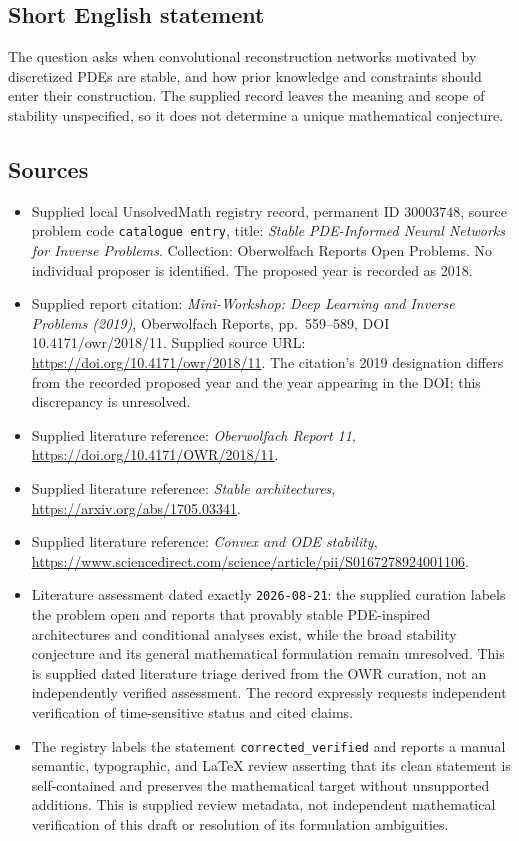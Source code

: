 \documentclass[11pt]{article}
\begin{document}
\subsection{Short English statement}
The question asks when convolutional reconstruction networks motivated by discretized PDEs are stable, and how prior knowledge and constraints should enter their construction. The supplied record leaves the meaning and scope of stability unspecified, so it does not determine a unique mathematical conjecture.
\subsection{Sources}
\begin{itemize}
\item Supplied local UnsolvedMath registry record, permanent ID \(30003748\), source problem code \texttt{catalogue entry}, title: \emph{Stable PDE-Informed Neural Networks for Inverse Problems}. Collection: Oberwolfach Reports Open Problems. No individual proposer is identified. The proposed year is recorded as 2018.
\item Supplied report citation: \emph{Mini-Workshop: Deep Learning and Inverse Problems (2019)}, Oberwolfach Reports, pp.\ 559--589, DOI 10.4171/owr/2018/11. Supplied source URL: \url{https://doi.org/10.4171/owr/2018/11}. The citation's 2019 designation differs from the recorded proposed year and the year appearing in the DOI; this discrepancy is unresolved.
\item Supplied literature reference: \emph{Oberwolfach Report 11}, \url{https://doi.org/10.4171/OWR/2018/11}.
\item Supplied literature reference: \emph{Stable architectures}, \url{https://arxiv.org/abs/1705.03341}.
\item Supplied literature reference: \emph{Convex and ODE stability}, \url{https://www.sciencedirect.com/science/article/pii/S0167278924001106}.
\item Literature assessment dated exactly \texttt{2026-08-21}: the supplied curation labels the problem open and reports that provably stable PDE-inspired architectures and conditional analyses exist, while the broad stability conjecture and its general mathematical formulation remain unresolved. This is supplied dated literature triage derived from the OWR curation, not an independently verified assessment. The record expressly requests independent verification of time-sensitive status and cited claims.
\item The registry labels the statement \texttt{corrected\_verified} and reports a manual semantic, typographic, and LaTeX review asserting that its clean statement is self-contained and preserves the mathematical target without unsupported additions. This is supplied review metadata, not independent mathematical verification of this draft or resolution of its formulation ambiguities.
\end{itemize}
\end{document}
